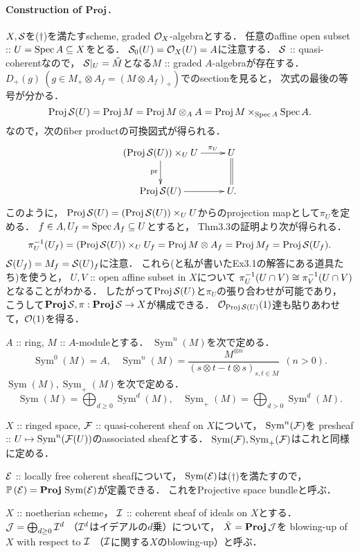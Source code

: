 \documentclass[a4paper]{jsarticle}
\newcommand{\gProj}{\mathbf{Proj}\,}
\newcommand{\Sym}{\operatorname{Sym}}
\newcommand{\pbundle}{\mathbb{P}\,}
\begin{document}
    \paragraph{Construction of $\gProj$.}
    $X, \mathcal{S}$を($\dagger$)を満たすscheme, graded $\mathcal{O}_X$-algebraとする．
    任意のaffine open subset :: $U=\operatorname{Spec} A \subseteq X$をとる．
    $\mathcal{S}_0(U)=\mathcal{O}_X(U)=A$に注意する．
    $\mathcal{S}$ :: quasi-coherentなので，
    $\mathcal{S}|_U=\tilde{M}$となる$M$ :: graded $A$-algebraが存在する．
    $D_+(g) ~(g \in M_+ \otimes A_f=(M \otimes A_f)_+)$でのsectionを見ると，
    次式の最後の等号が分かる．
    \[ \operatorname{Proj} \mathcal{S}(U)=\operatorname{Proj} M=\operatorname{Proj} M \otimes_A A=\operatorname{Proj} M \times_{\operatorname{Spec} A} \operatorname{Spec} A. \]
    なので，次のfiber productの可換図式が得られる．
    \[
        \xymatrix
        {
            (\Proj \shS(U)) \times_U U \ar[r]^-{\pi_U} \ar[d]_-{\pr}& U \ar@{=}[d] \\
            \Proj \shS(U) \ar[r]& U.
        }
    \]
    このように，
    $\operatorname{Proj} \mathcal{S}(U)=(\operatorname{Proj} \mathcal{S}(U)) \times_U U$からのprojection mapとして$\pi_U$を定める．
    $f \in A, U_f=\operatorname{Spec} A_f \subseteq U$とすると，
    Thm3.3の証明より次が得られる．
    \[ \pi_U^{-1}(U_f)=(\operatorname{Proj} \mathcal{S}(U)) \times_U U_f=\operatorname{Proj} M \otimes A_f=\operatorname{Proj} M_f=\operatorname{Proj} \mathcal{S}(U_f). \]
    $\mathcal{S}(U_f)=M_f=\mathcal{S}(U)_f$に注意．
    これら(と私が書いたEx3.1の解答にある道具たち)を使うと，
    $U,V$ :: open affine subset in $X$について
    $\pi_U^{-1}(U \cap V) \cong \pi_V^{-1}(U \cap V)$となることがわかる．
    したがって$\operatorname{Proj} \mathcal{S}(U)$と$\pi_U$の張り合わせが可能であり，
    こうして$\gProj \shS, \pi: \gProj \shS \to X$が構成できる．
    $\mathcal{O}_{\operatorname{Proj} \mathcal{S}(U)}(1)$達も貼りあわせて，$\mathcal{O}(1)$を得る．

    \begin{Def}
        $A$ :: ring,
        $M$ :: $A$-moduleとする．
        $\Sym^n(M)$を次で定める．
        \[
            \Sym^0(M)=A,~~~~
            \Sym^n(M)=\frac{M^{\otimes n}}{(s \otimes t-t \otimes s)_{s,t \in M}} ~~(n>0).
        \]
        $\Sym(M), \Sym_+(M)$を次で定める．
        \[
            \Sym(M)=\bigoplus_{d \geq 0} \Sym^d(M),~~~~
            \Sym_+(M)=\bigoplus_{d > 0} \Sym^d(M).
        \]

        $X$ :: ringed space,
        $\mathcal{F}$ :: quasi-coherent sheaf on $X$について，
        $\Sym^n(\shF)$を
        presheaf :: $U \mapsto \Sym^n(\shF(U))$のassociated sheafとする．
        $\Sym(\shF), \Sym_+(\shF)$はこれと同様に定める．
    \end{Def}

    \begin{Def}
        $\mathcal{E}$ :: locally free coherent sheafについて，
        $\Sym(\shE)$は($\dagger$)を満たすので，
        $\pbundle(\shE)=\gProj \Sym(\shE)$が定義できる．
        これをProjective space bundleと呼ぶ．
    \end{Def}

    \begin{Def}
        $X$ :: noetherian scheme，
        $\mathcal{I}$ :: coherent sheaf of ideals on $X$とする．
        $\mathcal{J}=\bigoplus_{d \geq 0} \mathcal{I}^{d}$
        （$\mathcal{I}^d$はイデアルの$d$乗）について，
        $\tilde{X}=\gProj \shJ$を
        blowing-up of $X$ with respect to $\mathcal{I}$
        （$\mathcal{I}$に関する$X$のblowing-up）と呼ぶ．
    \end{Def}
\end{document}
